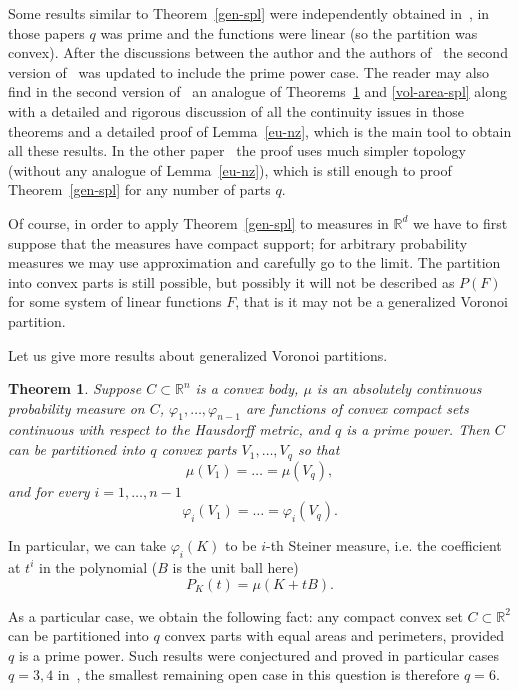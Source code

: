 \documentclass[12pt,a4paper,oneside]{amsart}
\newtheorem{thm}{Theorem}[section]
\theoremstyle{definition}
\theoremstyle{remark}
\numberwithin{equation}{section}
\renewcommand{\phi}{\varphi}
\begin{document}
Some results similar to Theorem~\ref{gen-spl} were independently obtained in~\cite{arhu2010, sob2010}, in those papers $q$ was prime and the functions were linear (so the partition was convex). After the discussions between the author and the authors of~\cite{arhu2010} the second version of~\cite{arhu2010} was updated to include the prime power case. The reader may also find in the second version of~\cite{arhu2010} an analogue of Theorems~\ref{func-spl} and \ref{vol-area-spl} along with a detailed and rigorous discussion of all the continuity issues in those theorems and a detailed proof of Lemma~\ref{eu-nz}, which is the main tool to obtain all these results. In the other paper~\cite{sob2010} the proof uses much simpler topology (without any analogue of Lemma~\ref{eu-nz}), which is still enough to proof Theorem~\ref{gen-spl} for any number of parts $q$.

Of course, in order to apply Theorem~\ref{gen-spl} to measures in $\mathbb R^d$ we have to first suppose that the measures have compact support; for arbitrary probability measures we may use approximation and carefully go to the limit. The partition into convex parts is still possible, but possibly it will not be described as $P(F)$ for some system of linear functions $F$, that is it may not be a generalized Voronoi partition.

Let us give more results about generalized Voronoi partitions.

\begin{thm}
\label{func-spl}
Suppose $C\subset\mathbb R^n$ is a convex body, $\mu$ is an absolutely continuous probability measure on  $C$, $\phi_1, \ldots, \phi_{n-1}$ are functions of convex compact sets continuous with respect to the Hausdorff metric, and $q$ is a prime power. Then $C$ can be partitioned into $q$ convex parts $V_1,\ldots, V_q$ so that 
$$
\mu(V_1) = \dots = \mu(V_q),
$$
and for every $i = 1,\ldots, n-1$
$$
\phi_i(V_1) = \dots = \phi_i(V_q).
$$
\end{thm}

In particular, we can take $\phi_i(K)$ to be $i$-th Steiner measure, i.e. the coefficient at $t^i$ in the polynomial ($B$ is the unit ball here)
$$
P_K(t) = \mu(K+tB).
$$

As a particular case, we obtain the following fact: any compact convex set $C\subset \mathbb R^2$ can be partitioned into $q$ convex parts with equal areas and perimeters, provided $q$ is a prime power. Such results were conjectured and proved in particular cases $q=3, 4$ in~\cite{nara2008,barblsz2010}, the smallest remaining open case in this question is therefore $q=6$.
\end{document}
